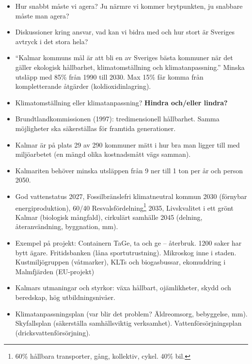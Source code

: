 \documentclass[12pt,a4paper]{article}
\begin{document}
\begin{itemize}
\item Hur snabbt måste vi agera? Ju närmre vi kommer brytpunkten, ju snabbare måste man agera?

\item Diskussioner kring ansvar, vad kan vi bidra med och hur stort är Sveriges avtryck i det stora hela?
  
\item ``Kalmar kommuns mål är att bli en av Sveriges bästa kommuner när det gäller ekologisk hållbarhet, klimatomställning och klimatanpassning.''
  Minska utsläpp med 85\% från 1990 till 2030.
  Max 15\% får komma från kompletterande åtgärder (koldioxidinlagring).

\item Klimatomställning eller klimatanpassning?
  \textbf{Hindra och/eller lindra?}
  
\item Brundtlandkommissionen (1997): tredimensionell hållbarhet. Samma möjligheter ska säkerställas för framtida generationer. 

\item Kalmar är på plats 29 av 290 kommuner mätt i hur bra man ligger till med miljöarbetet (en mängd olika kostnadsmått vägs samman).

\item Kalmariten behöver minska utsläppen från 9 ner till 1 ton per år och person 2050.

\item God vattenstatus 2027, Fossilbränslefri klimatneutral kommun 2030 (förnybar energiproduktion), 60/40 Resvalsfördelning\footnote{60\% hållbara transporter, gång, kollektiv, cykel. 40\% bil.} 2035, Livskvalitet i ett grönt Kalmar (biologisk mångfald), cirkulärt samhälle 2045 (delning, återanvändning, byggnation, mm).

\item Exempel på projekt: Containern TaGe, ta och ge -- återbruk. 1200 saker har bytt ägare. Fritidsbanken (låna sportutrustning). Mikroskog inne i staden. Kustmiljögruppen (våtmarker), KLTs och biogasbussar, ekomuddring i Malmfjärden (EU-projekt)

\item Kalmars utmaningar och styrkor: växa hållbart, ojämlikheter, skydd och beredskap, hög utbildningsnivåer.

\item Klimatanpassningsplan (var blir det problem? Äldreomsorg, bebyggelse, mm). Skyfallsplan (säkerställa samhällsviktig verksamhet). Vattenförsörjningsplan (dricksvattenförsörjning).


\end{itemize}
\end{document}
